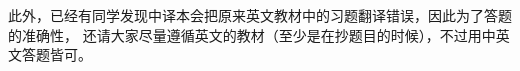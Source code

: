 \documentclass[UTF8,12pt,a4paper]{ctexart}
\begin{document}
此外，已经有同学发现中译本会把原来英文教材中的习题翻译错误，因此为了答题的准确性，
还请大家尽量遵循英文的教材（至少是在抄题目的时候），不过用中英文答题皆可。








\end{document}
